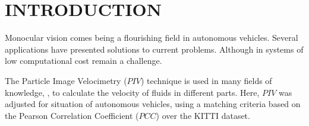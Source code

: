 \section{INTRODUCTION}

Monocular vision comes being a flourishing field in autonomous vehicles. 
Several applications have presented solutions to current problems. 
Although in systems  of low computational cost remain a challenge. 


The Particle Image Velocimetry ($PIV$)\cite{Bastiaans} technique is used in many fields of 
knowledge, \cite{Story, Xu}, to calculate the velocity of fluids in different parts. 
Here, $PIV$ was adjusted for situation of autonomous vehicles, using a matching criteria based on 
the Pearson Correlation Coefficient ($PCC$)\cite{Miranda Neto} over the KITTI dataset\cite{Geiger}.


